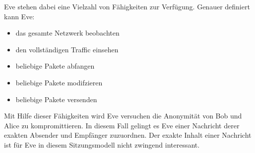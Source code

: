 \newpage
Eve stehen dabei eine Vielzahl von Fähigkeiten zur Verfügung. Genauer definiert kann Eve:
\begin{itemize}
	\item das gesamte Netzwerk beobachten
	\item den vollständigen Traffic einsehen
	\item beliebige Pakete abfangen
	\item beliebige Pakete modifzieren
	\item beliebige Pakete versenden
\end{itemize}

Mit Hilfe dieser Fähigkeiten wird Eve versuchen die Anonymität von Bob und Alice zu kompromittieren. In diesem Fall gelingt es Eve einer Nachricht derer exakten Absender und Empfänger zuzuordnen. Der exakte Inhalt einer Nachricht ist für Eve in diesem Sitzungsmodell nicht zwingend interessant.